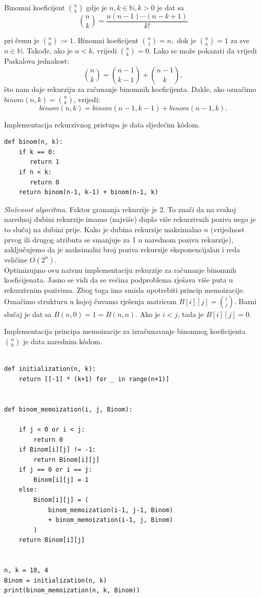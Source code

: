   \begin{definition}
  	 Binomni koeficijent $\binom{n}{k}$ gdje je $n, k \in \mathbb{N}, k > 0$  je dat sa 
  	 $$\binom{n}{k} = \frac{n(n-1) \cdots (n-k+1)}{k!}$$
  \end{definition}
  
pri čemu je $\binom{n}{0} := 1$. Binomni koeficijent $\binom{n}{1} = n,$ dok je $\binom{n}{n} = 1$ za sve $n \in \mathbb{N}.$ Takođe, ako je $n <k$, vrijedi $\binom{n}{k}=0$.   Lako se može pokazati da vrijedi Paskalova jednakost:
  $$ \binom{n}{k} = \binom{n-1}{k-1} + \binom{n-1}{k},$$
   što nam daje rekurziju za računanje binomnih koeficijenta. Dakle, ako označimo $binom(n, k) = \binom{n}{k}$, vrijedi:
   $$ binom(n, k)= binom(n-1, k-1) + binom(n-1, k).$$
   
   Implementacija rekurzivnog pristupa je data sljedećim k\^odom.
   
   \begin{verbatim}
def binom(n, k): 
    if k == 0:
       return 1
    if n < k:
       return 0
    return binom(n-1, k-1) + binom(n-1, k)
\end{verbatim}
  \textit{Složenost algoritma}. Faktor grananja rekurzije je 2. To znači da na svakoj narednoj dubini rekurzije imamo (najviše) duplo više rekurzivnih poziva nego je to slučaj na dubini prije.  Kako je dubina rekurzije maksimalno $n$ (vrijednost prvog ili drugog atributa se smanjuje za 1 u narednom pozivu rekurzije), zaključujemo da je maksimalni broj poziva rekurzije eksponenci\-jalan i reda veličine $O(2^n)$. \\
  
  Optimizujmo ovu naivnu implementaciju rekurzije za računanje binomnih koeficijenata.  Jasno se vidi da se većina podproblema rješava više puta u rekurzivnim pozivima. Zbog toga ima smisla upotrebiti princip memoizacije. Označimo strukturu u kojoj čuvamo rješenja matricom $B[i][j]= \binom{i}{j}$. Bazni slučaj je  dat sa $B(n, 0) = 1 = B(n,n)$. Ako je $i < j$, tada je $B[i][j] = 0$. 
  
  Implementacija principa memoizacije za izračunavanje binomnog koefici\-jenta $\binom{n}{k}$ je data narednim k\^odom. 
  
  \begin{verbatim}
  	
def initialization(n, k):
    return [[-1] * (k+1) for _ in range(n+1)]


def binom_memoization(i, j, Binom):

    if j < 0 or i < j:
        return 0
    if Binom[i][j] != -1:
        return Binom[i][j]
    if j == 0 or i == j:
        Binom[i][j] = 1
    else:
        Binom[i][j] = (
            binom_memoization(i-1, j-1, Binom)
            + binom_memoization(i-1, j, Binom)
        )
    return Binom[i][j]


n, k = 10, 4
Binom = initialization(n, k)
print(binom_memoization(n, k, Binom))
\end{verbatim}  
  
